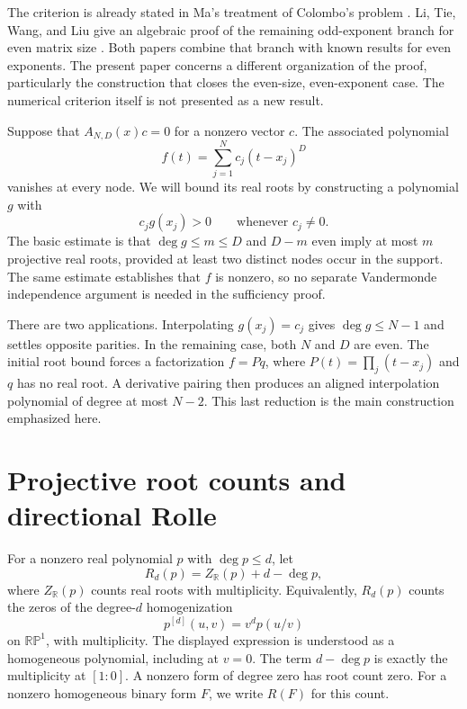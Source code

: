 \documentclass[11pt,a4paper]{article}
\numberwithin{equation}{section}
\theoremstyle{remark}
\newcommand{\R}{\mathbb R}
\newcommand{\RP}{\mathbb {RP}^{1}}
\begin{document}
The criterion is already stated in Ma's treatment of Colombo's problem
\cite{Ma}. Li, Tie, Wang, and Liu give an algebraic proof of the remaining
odd-exponent branch for even matrix size \cite{Li}. Both papers combine that
branch with known results for even exponents. The present paper concerns a
different organization of the proof, particularly the construction that
closes the even-size, even-exponent case. The numerical criterion itself is
not presented as a new result.

Suppose that $A_{N,D}(x)c=0$ for a nonzero vector $c$. The associated polynomial
\begin{equation}\label{eq:kernel-polynomial}
 f(t)=\sum_{j=1}^{N}c_j(t-x_j)^D
\end{equation}
vanishes at every node. We will bound its real roots by constructing a
polynomial $g$ with
\begin{equation}\label{eq:alignment}
 c_jg(x_j)>0\qquad\text{whenever }c_j\ne0.
\end{equation}
The basic estimate is that $\deg g\le m\le D$ and $D-m$ even imply at most
$m$ projective real roots, provided at least two distinct nodes occur in the
support. The same estimate establishes that $f$ is nonzero, so no separate
Vandermonde independence argument is needed in the sufficiency proof.

There are two applications. Interpolating $g(x_j)=c_j$ gives $\deg g\le N-1$
and settles opposite parities. In the remaining case, both $N$ and $D$ are
even. The initial root bound forces a factorization $f=Pq$, where
$P(t)=\prod_j(t-x_j)$ and $q$ has no real root. A derivative pairing then
produces an aligned interpolation polynomial of degree at most $N-2$.
This last reduction is the main construction emphasized here.

\section{Projective root counts and directional Rolle}

For a nonzero real polynomial $p$ with $\deg p\le d$, let
\begin{equation}\label{eq:root-count}
 R_d(p)=Z_\R(p)+d-\deg p,
\end{equation}
where $Z_\R(p)$ counts real roots with multiplicity. Equivalently, $R_d(p)$
counts the zeros of the degree-$d$ homogenization
\[
 p^{[d]}(u,v)=v^dp(u/v)
\]
on $\RP$, with multiplicity. The displayed expression is understood as a
homogeneous polynomial, including at $v=0$. The term $d-\deg p$ is exactly
the multiplicity at $[1:0]$. A nonzero form of degree zero has root count zero.
For a nonzero homogeneous binary form $F$, we write $R(F)$ for this count.
\end{document}
